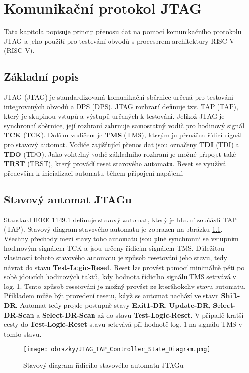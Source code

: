 \chapter{Komunikační protokol JTAG}
Tato kapitola popisuje princip přenosu dat na pomocí komunikačního protokolu JTAG a jeho použití pro testování obvodů s procesorem architektury \acs{RISC-V} (\acl{RISC-V}).

\section{Základní popis}
\acs{JTAG} (\acl{JTAG}) je standardizovaná komunikační sběrnice určená pro testování integrovaných obvodů a \acs{DPS} (\acl{DPS}).
\acs{JTAG} rozhraní definuje tzv. \acs{TAP} (\acl{TAP}), který je skupinou vstupů a výstupů určených k testování. Jelikož \acs{JTAG} je synchronní sběrnice, její rozhraní zahrnuje samostatný vodič pro hodinový signál \textbf{\acs{TCK}} (\acl{TCK}). Dalším vodičem je \textbf{\acs{TMS}} (\acl{TMS}), kterým je přenášen řídicí signál pro stavový automat. Vodiče zajišťující přenos dat jsou označeny \textbf{\acs{TDI}} (\acl{TDI}) a \textbf{\acs{TDO}} (\acl{TDO}). Jako volitelný vodič základního rozhraní je možné připojit také \textbf{\acs{TRST}} (\acl{TRST}), který provádí reset stavového automatu. Reset se využívá především k inicializaci automatu během připojení napájení. \cite {IEEE_1149-1} \cite{JTAG}      

\section{Stavový automat JTAGu}
Standard IEEE 1149.1 definuje stavový automat, který je hlavní součástí \acs{TAP} (\acl{TAP}). Stavový diagram stavového automatu je zobrazen na obrázku \ref{fig:tap_controller}. Všechny přechody mezi stavy toho automatu jsou plně synchronní se vstupním hodinovým signálem \acs{TCK} a jsou určeny řídicím signálem \acs{TMS}. Důležitou vlastností tohoto stavového automatu je způsob resetování jeho stavu, tedy návrat do stavu \textbf{Test-Logic-Reset}. Reset lze provést pomocí minimálně pěti po sobě jdoucích hodinových taktů, kdy hodnota řídicího signálu \acs{TMS} setrvává v log. 1. Tento způsob resetování je možný provést ze kteréhokoliv stavu automatu. Příkladem může být provedení resetu, když se automat nachází ve stavu \textbf{Shift-DR}. Automat tedy projde postupně stavy \textbf{Exit1-DR}, \textbf{Update-DR}, \textbf{Select-DR-Scan} a \textbf{Select-DR-Scan} až do stavu \textbf{Test-Logic-Reset}. V případě kratší cesty do \textbf{Test-Logic-Reset} stavu setrvává při hodnotě log. 1 na signálu \acs{TMS} v tomto stavu.
\begin{figure}[H]
  \begin{center}
    \texttt{[image: obrazky/JTAG\_TAP\_Controller\_State\_Diagram.png]}
  \end{center}
  \caption{Stavový diagram řídicího stavového automatu JTAGu \cite{JTAG_TAP_diagram}}
	\label{fig:tap_controller}
\end{figure}


